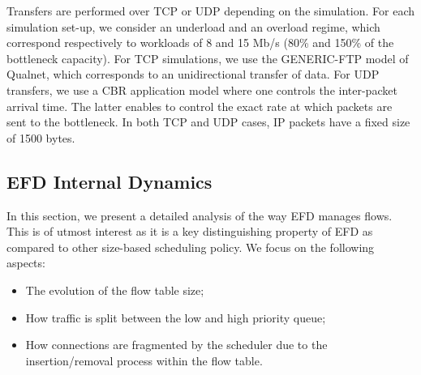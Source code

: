\documentclass[preprint,12pt]{elsarticle}
\begin{document}
Transfers are performed over TCP or UDP depending on the simulation. For each simulation set-up, we consider an underload and an overload regime, which correspond respectively to workloads of 8 and 15 Mb/s (80\% and 150\% of the bottleneck capacity). For TCP simulations, we use the GENERIC-FTP model of Qualnet, which corresponds to an unidirectional transfer of data. For UDP transfers, we use a CBR application model where one controls the inter-packet arrival time. The latter enables to control the exact rate at which packets are sent to the bottleneck. In both TCP and UDP cases, IP packets have a fixed size of 1500 bytes.


\subsection{EFD Internal Dynamics }


In this section, we present a detailed analysis of the way EFD manages flows. This is of utmost interest as it is a key distinguishing property of EFD as compared to other size-based scheduling policy. We focus on the following aspects:
\begin{itemize}
\item The evolution of the flow table size;
\item How traffic is split between the low and high priority queue;
\item  How connections are fragmented by the scheduler due to the insertion/removal process within the flow table.
\end{itemize}


\end{document}
